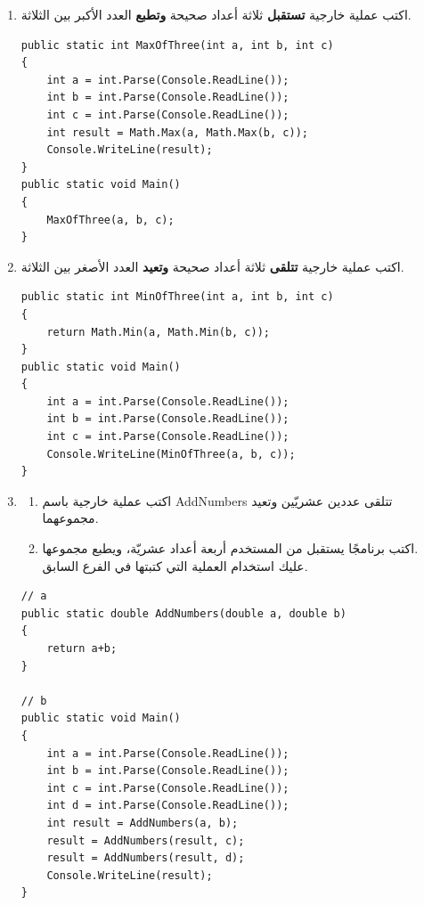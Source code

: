 ﻿\documentclass[14pt]{extarticle}
\begin{document}
\begin{enumerate}[itemsep=3em]
\begin{enumerate}
\item اكتب عملية خارجية \textbf{تستقبل} ثلاثة أعداد صحيحة \textbf{وتطبع} العدد الأكبر بين الثلاثة.
\ifwithsols
\begin{boxSolution}
\begin{english}
\begin{verbatim}
public static int MaxOfThree(int a, int b, int c)
{
    int a = int.Parse(Console.ReadLine());
    int b = int.Parse(Console.ReadLine());
    int c = int.Parse(Console.ReadLine());
    int result = Math.Max(a, Math.Max(b, c));
    Console.WriteLine(result);
}
public static void Main()
{
    MaxOfThree(a, b, c);
}
\end{verbatim}
\end{english}
\end{boxSolution}
\clearpage
\fi


\item اكتب عملية خارجية \textbf{تتلقى} ثلاثة أعداد صحيحة \textbf{وتعيد} العدد الأصغر بين الثلاثة.
\ifwithsols
\begin{boxSolution}
\begin{english}
\begin{verbatim}
public static int MinOfThree(int a, int b, int c)
{
    return Math.Min(a, Math.Min(b, c));
}
public static void Main()
{
    int a = int.Parse(Console.ReadLine());
    int b = int.Parse(Console.ReadLine());
    int c = int.Parse(Console.ReadLine());
    Console.WriteLine(MinOfThree(a, b, c));
}
\end{verbatim}
\end{english}
\end{boxSolution}
\clearpage
\fi

\item
\begin{enumerate}
    \item اكتب عملية خارجية باسم \textenglish{AddNumbers} تتلقى عددين عشريّين وتعيد مجموعهما.
    \item اكتب برنامجًا يستقبل من المستخدم أربعة أعداد عشريّة، ويطبع مجموعها. \\
    عليك استخدام العملية التي كتبتها في الفرع السابق.
\end{enumerate}
\ifwithsols
\begin{boxSolution}
\begin{english}
\begin{verbatim}
// a
public static double AddNumbers(double a, double b)
{
    return a+b;
}

// b
public static void Main()
{
    int a = int.Parse(Console.ReadLine());
    int b = int.Parse(Console.ReadLine());
    int c = int.Parse(Console.ReadLine());
    int d = int.Parse(Console.ReadLine());
    int result = AddNumbers(a, b);
    result = AddNumbers(result, c);
    result = AddNumbers(result, d);
    Console.WriteLine(result);
}
\end{verbatim}
\end{english}
\end{boxSolution}
\fi


\end{enumerate}
\end{enumerate}
\end{document}
